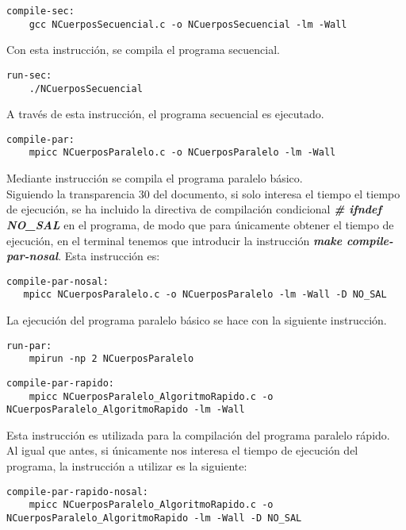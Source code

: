 \documentclass[11pt]{article}
\begin{document}
\begin{lstlisting}[style=C, numbers=none]
compile-sec:
	gcc NCuerposSecuencial.c -o NCuerposSecuencial -lm -Wall
\end{lstlisting}
Con esta instrucción, se compila el programa secuencial.\\

\begin{lstlisting}[style=C, numbers=none]
run-sec:
	./NCuerposSecuencial
\end{lstlisting}
A través de esta instrucción, el programa secuencial es ejecutado. \\

\begin{lstlisting}[style=C, numbers=none]
compile-par:
	mpicc NCuerposParalelo.c -o NCuerposParalelo -lm -Wall
\end{lstlisting}
Mediante instrucción se compila el programa paralelo básico. \\

Siguiendo la transparencia 30 del documento, si solo interesa el tiempo el tiempo de ejecución, se ha incluido la directiva de compilación condicional \textbf{\textit{\# ifndef NO\_SAL}} en el programa, de modo que para únicamente obtener el tiempo de ejecución, en el terminal tenemos que introducir la instrucción \textbf{\textit{make compile-par-nosal}}. Esta instrucción es:

\begin{lstlisting}[style=C, numbers=none]
compile-par-nosal:
   mpicc NCuerposParalelo.c -o NCuerposParalelo -lm -Wall -D NO_SAL
\end{lstlisting}
La ejecución del programa paralelo básico se hace con la siguiente instrucción.
\begin{lstlisting}[style=C, numbers=none]
run-par:
	mpirun -np 2 NCuerposParalelo
\end{lstlisting}
\newpage

\begin{lstlisting}[style=C, numbers=none]
compile-par-rapido:
	mpicc NCuerposParalelo_AlgoritmoRapido.c -o NCuerposParalelo_AlgoritmoRapido -lm -Wall
\end{lstlisting}

Esta instrucción es utilizada para la compilación del programa paralelo rápido. \\

Al igual que antes, si únicamente nos interesa el tiempo de ejecución del programa, la instrucción a utilizar es la siguiente:
\begin{lstlisting}[style=C, numbers=none]
compile-par-rapido-nosal:
	mpicc NCuerposParalelo_AlgoritmoRapido.c -o NCuerposParalelo_AlgoritmoRapido -lm -Wall -D NO_SAL
\end{lstlisting}
\end{document}
